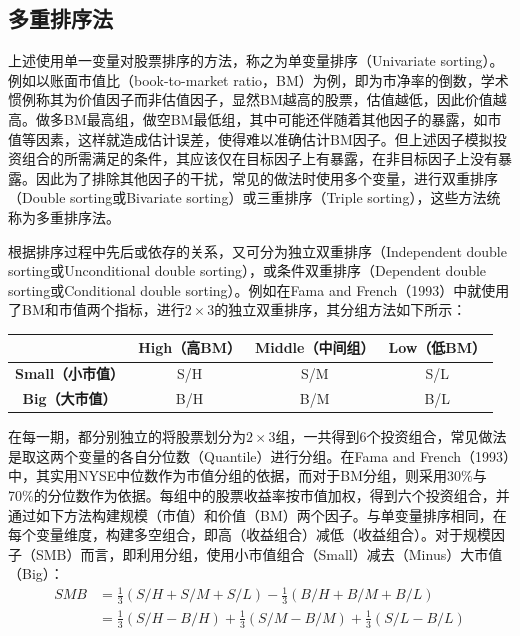 \documentclass[11pt]{article}
\begin{document}
\subsection{多重排序法}

上述使用单一变量对股票排序的方法，称之为单变量排序（Univariate sorting）。例如以账面市值比（book-to-market ratio，BM）为例，即为市净率的倒数，学术惯例称其为价值因子而非估值因子，显然BM越高的股票，估值越低，因此价值越高。做多BM最高组，做空BM最低组，其中可能还伴随着其他因子的暴露，如市值等因素，这样就造成估计误差，使得难以准确估计BM因子。但上述因子模拟投资组合的所需满足的条件，其应该仅在目标因子上有暴露，在非目标因子上没有暴露。因此为了排除其他因子的干扰，常见的做法时使用多个变量，进行双重排序（Double sorting或Bivariate sorting）或三重排序（Triple sorting），这些方法统称为多重排序法。

根据排序过程中先后或依存的关系，又可分为独立双重排序（Independent double sorting或Unconditional double sorting），或条件双重排序（Dependent double sorting或Conditional double sorting）。例如在Fama and French（1993）中就使用了BM和市值两个指标，进行$2 \times 3$的独立双重排序，其分组方法如下所示：

\begin{table}[H]
\centering
\begin{tabular}{@{}cccc@{}}
\toprule
& \textbf{High（高BM）} & \textbf{Middle（中间组）} & \textbf{Low（低BM）} \\ \midrule
\textbf{Small（小市值）} & S/H & S/M & S/L \\
\textbf{Big（大市值）}   & B/H & B/M & B/L \\ \bottomrule
\end{tabular}
\end{table}

在每一期，都分别独立的将股票划分为$2 \times 3$组，一共得到6个投资组合，常见做法是取这两个变量的各自分位数（Quantile）进行分组。在Fama and French（1993）中，其实用NYSE中位数作为市值分组的依据，而对于BM分组，则采用30\%与70\%的分位数作为依据。每组中的股票收益率按市值加权，得到六个投资组合，并通过如下方法构建规模（市值）和价值（BM）两个因子。与单变量排序相同，在每个变量维度，构建多空组合，即高（收益组合）减低（收益组合）。对于规模因子（SMB）而言，即利用分组，使用小市值组合（Small）减去（Minus）大市值（Big）：
\begin{align*}
    SMB &= \frac{1}{3}(S/H + S/M + S/L) - \frac{1}{3}(B/H + B/M + B/L) \\
    &= \frac{1}{3}(S/H-B/H) + \frac{1}{3}(S/M-B/M) + \frac{1}{3}(S/L-B/L)
\end{align*}
\end{document}
